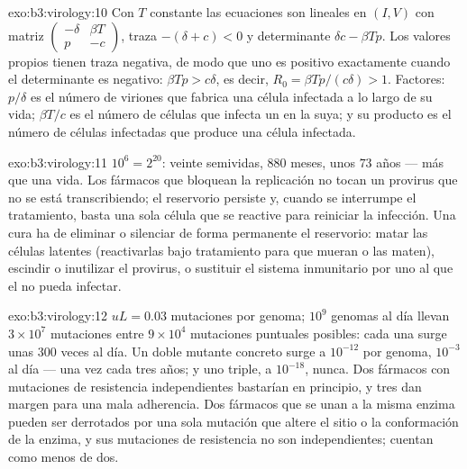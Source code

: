 \begin{solution}{exo:b3:virology:10}
Con $T$ constante las ecuaciones son lineales en $(I, V)$ con matriz
$\begin{pmatrix} -\delta & \beta T \\ p & -c \end{pmatrix}$, traza
$-(\delta + c) < 0$ y determinante $\delta c - \beta Tp$. Los valores
propios tienen traza negativa, de modo que uno es positivo exactamente
cuando el determinante es negativo: $\beta Tp > c\delta$, es decir,
$R_{0} = \beta
Tp/(c\delta) > 1$. Factores: $p/\delta$ es el número de viriones que
fabrica una célula infectada a lo largo de su vida; $\beta T/c$ es el
número de células que infecta un  en la suya; y su producto es el
número de células infectadas que produce una célula infectada.
\end{solution}

\begin{solution}{exo:b3:virology:11}
$10^{6} = 2^{20}$: veinte semividas, $880$ meses, unos $73$ años --- más
que una vida. Los fármacos que bloquean la replicación no tocan un
provirus que no se está transcribiendo; el reservorio persiste y, cuando
se interrumpe el tratamiento, basta una sola célula que se reactive para
reiniciar la infección. Una cura ha de eliminar o silenciar de forma
permanente el reservorio: matar las células latentes (reactivarlas bajo
tratamiento para que mueran o las maten), escindir o inutilizar el
provirus, o sustituir el sistema inmunitario por uno al que el  no
pueda infectar.
\end{solution}

\begin{solution}{exo:b3:virology:12}
$uL = 0.03$ mutaciones por genoma; $10^{9}$ genomas al día llevan
$3\times
10^{7}$ mutaciones entre $9\times 10^{4}$ mutaciones puntuales posibles:
cada una surge unas $300$ veces al día. Un doble mutante concreto surge a
$10^{-12}$ por genoma, $10^{-3}$ al día --- una vez cada tres años; y uno
triple, a $10^{-18}$, nunca. Dos fármacos con mutaciones de resistencia
independientes bastarían en principio, y tres dan margen para una mala
adherencia. Dos fármacos que se unan a la misma enzima pueden ser
derrotados por una sola mutación que altere el sitio o la conformación de
la enzima, y sus mutaciones de resistencia no son independientes; cuentan
como menos de dos.
\end{solution}

